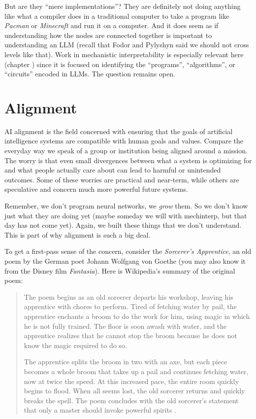 But are they ``mere implementations''? They are definitely not doing anything like what a compiler does in a traditional computer to take a program like \emph{Pacman} or \emph{Minecraft} and run it on a computer. And it does seem as if understanding how the nodes are connected together is important to understanding an LLM (recall that Fodor and Pylyshyn said we should not cross levels like that).
Work in mechanistic interpretability is especially
relevant here (chapter ) since it is focused on identifying the ``programs'', ``algorithms'', or ``circuits'' encoded in LLMs. The question remains open.

\section{Alignment}

AI alignment is the field concerned with ensuring that the goals of
artificial intelligence systems are compatible with human goals and values.
Compare the everyday way we speak of a group or institution being aligned
around a mission. The
worry is that even small divergences between what a system is optimizing for
and what people actually care about can lead to harmful or unintended
outcomes. Some of these worries are practical and near-term, while others are
speculative and concern much more powerful future systems.

Remember, we don't program neural networks, we \emph{grow} them. So we don't know just what they are doing yet (maybe someday we will with mechinterp, but that day has not come yet). Again, we built these things that we don't understand. This is part of why alignment is such a big deal.

To get a first-pass sense of the concern, consider the \emph{Sorcerer's Apprentice}, an old poem by the German poet Johann Wolfgang von Goethe (you may also know it from the Disney film \emph{Fantasia}). Here is Wikipedia's summary of the original poem:

\begin{quote}
The poem begins as an old sorcerer departs his workshop, leaving his apprentice with chores to perform. Tired of fetching water by pail, the apprentice enchants a broom to do the work for him, using magic in which he is not fully trained. The floor is soon awash with water, and the apprentice realizes that he cannot stop the broom because he does not know the magic required to do so.

The apprentice splits the broom in two with an axe, but each piece becomes a whole broom that takes up a pail and continues fetching water, now at twice the speed. At this increased pace, the entire room quickly begins to flood. When all seems lost, the old sorcerer returns and quickly breaks the spell. The poem concludes with the old sorcerer's statement that only a master should invoke powerful spirits \cite{wikisorcerer2026}.
\end{quote}

